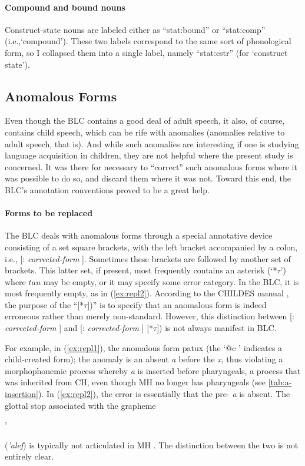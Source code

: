 \paragraph{Compound and bound nouns}
Construct-state nouns are labeled either as ``\textsf{stat:bound}'' 
or ``\textsf{stat:comp}'' (i.e.,`compound'). 
These two labels correspond to the same sort of phonological form, 
 so I collapsed them into a single label, namely 
``\textsf{stat:cstr}'' (for `construct state').

\subsection{Anomalous Forms}\label{sec:anomolous}

Even though the \ac{BLC} contains a good deal of adult speech, it also, 
of course, contains child speech, which  
can be rife with anomalies (anomalies relative to adult speech, that is). 
And while such anomalies are interesting if one is studying language acquisition 
in children, they are not helpful where the present study is concerned. It 
was there for necessary to ``correct'' such anomalous forms where it was 
possible to do so, and discard them where it was not. Toward this end, 
the \ac{BLC}'s annotation conventions proved to be a great help.

\paragraph{Forms to be replaced}
The \ac{BLC} deals with anomalous forms through a special 
annotative device consisting of a set square brackets, with the left bracket 
accompanied
by a colon, i.e., \textsf{[: \textit{corrected-form} ]}. Sometimes these brackets 
are followed by another set
of brackets. This latter set, if present, most frequently contains an asterisk 
(`*$\tau$') where $tau$ may be empty, or it may specify some error category. 
In the \ac{BLC}, it is most frequently empty, as in (\ref{ex:repl2}). 
According to the CHILDES manual \citep{macwhinney:2000b}, the purpose 
of the ``\textsf{[*$\tau$])}'' 
is to specify that an anomalous form is 
indeed erroneous rather than merely non-standard. 
However, this distinction between 
\textsf{[: \textit{corrected-form} ]} and 
\textsf{[: \textit{corrected-form} ] [*{$\tau$}])} is not always manifest in \ac{BLC}.

For example, in (\ref{ex:repl1}), the anomalous 
form \textsf{patux} 
(the `\textsf{@c} ' indicates a child-created form); 
the anomaly is an absent \textit{a} before the \textit{x}, thus violating 
a morphophonemic process 
whereby \textit{a} is inserted before pharyngeals, a process that was inherited 
from \ac{CH}, even though \ac{MH} no longer has pharyngeals (see \ref{tab:a-insertion}).
In (\ref{ex:repl2}), the error is essentially that the pre-\textit{} 
\textit{a} is absent. The glottal stop
associated with the grapheme \begin{cjhebrew}'\end{cjhebrew} (\textit{'alef}) 
is typically not articulated in \ac{MH} \citep{montoya:2014}. The distinction
between the two is not entirely clear.

